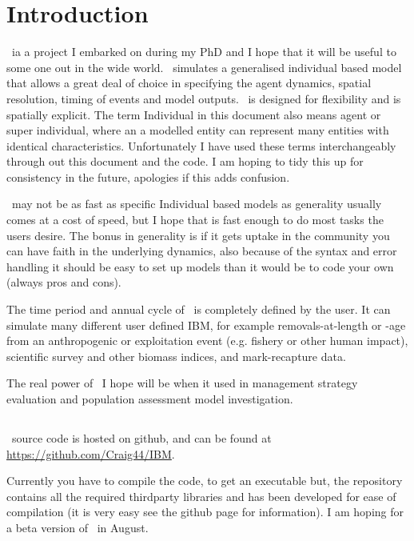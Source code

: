 \section{Introduction\label{sec:Introduction}} 

\IBM\ ia a project I embarked on during my PhD and I hope that it will be useful to some one out in the wide world. \IBM\ simulates a generalised individual based model that allows a great deal of choice in specifying the agent dynamics, spatial resolution, timing of events and model outputs. \IBM\ is designed for flexibility and is spatially explicit. The term Individual in this document also means agent or super individual, where an a modelled entity can represent many entities with identical characteristics. Unfortunately I have used these terms interchangeably through out this document and the code. I am hoping to tidy this up for consistency in the future, apologies if this adds confusion.

\IBM\ may not be as fast as specific Individual based models as generality usually comes at a cost of speed, but I hope that is fast enough to do most tasks the users desire. The bonus in generality is if it gets uptake in the community you can have faith in the underlying dynamics, also because of the syntax and error handling it should be easy to set up models than it would be to code your own (always pros and cons).

The time period and annual cycle of \IBM\ is completely defined by the user. It can simulate many different user defined IBM, for example removals-at-length or -age from an anthropogenic or exploitation event (e.g. fishery or other human impact), scientific survey and other biomass indices, and mark-recapture data.

The real power of \IBM\ I hope will be when it used in management strategy evaluation and population assessment model investigation.


\subsection{}
\IBM\ source code is hosted on github, and can be found at \url{https://github.com/Craig44/IBM}.

Currently you have to compile the code, to get an executable but, the repository contains all the required thirdparty libraries and has been developed for ease of compilation (it is very easy see the github page for information). I am hoping for a beta version of \IBM\ in August.

